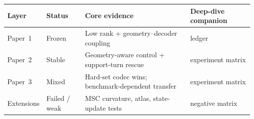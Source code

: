 \begin{tabular}{p{1.2cm}p{0.9cm}p{2.25cm}p{1.55cm}}
\toprule
Layer & Status & Core evidence & Deep-dive companion \\
\midrule
Paper~1 & Frozen & Low rank + geometry--decoder coupling & ledger \\
Paper~2 & Stable & Geometry-aware control + support-turn rescue & experiment matrix \\
Paper~3 & Mixed & Hard-set codec wins; benchmark-dependent transfer & experiment matrix \\
Extensions & Failed / weak & MSC curvature, atlas, state-update tests & negative matrix \\
\bottomrule
\end{tabular}